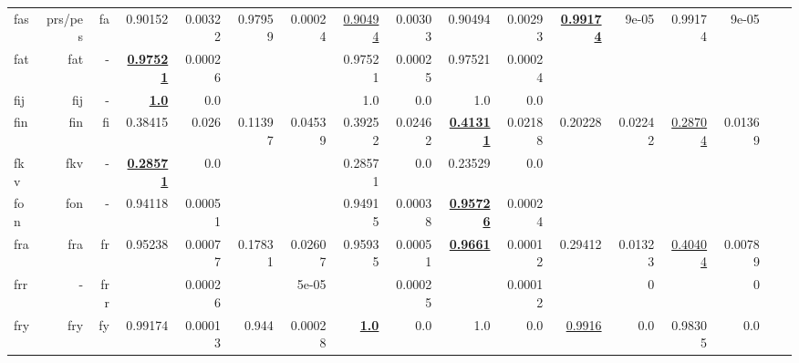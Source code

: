 \documentclass[11pt]{article}
\begin{document}
\begin{table*}[h]
{\begin{tabular}{lrrrrrrrrrrrrrrrr}
fas         & prs/pes         & fa         & 0.90152         & 0.00322         & 0.97959         & 0.00024         & \underline{0.90494}         & 0.00303         & 0.90494         & 0.00293         & \textbf{\underline{0.99174}}         & 9e-05         & 0.99174         & 9e-05         \\
fat         & fat         & -         & \textbf{\underline{0.97521}}         & 0.00026         &          &          & 0.97521         & 0.00025         & 0.97521         & 0.00024         &          &          &          &          \\
fij         & fij         & -         & \textbf{\underline{1.0}}         & 0.0         &          &          & 1.0         & 0.0         & 1.0         & 0.0         &          &          &          &          \\
fin         & fin         & fi         & 0.38415         & 0.026         & 0.11397         & 0.04539         & 0.39252         & 0.02462         & \textbf{\underline{0.41311}}         & 0.02188         & 0.20228         & 0.02242         & \underline{0.28704}         & 0.01369         \\
fkv         & fkv         & -         & \textbf{\underline{0.28571}}         & 0.0         &          &          & 0.28571         & 0.0         & 0.23529         & 0.0         &          &          &          &          \\
fon         & fon         & -         & 0.94118         & 0.00051         &          &          & 0.94915         & 0.00038         & \textbf{\underline{0.95726}}         & 0.00024         &          &          &          &          \\
fra         & fra         & fr         & 0.95238         & 0.00077         & 0.17831         & 0.02607         & 0.95935         & 0.00051         & \textbf{\underline{0.9661}}         & 0.00012         & 0.29412         & 0.01323         & \underline{0.40404}         & 0.00789         \\
frr         & -         & frr         &          & 0.00026         &          & 5e-05         &          & 0.00025         &          & 0.00012         &          & 0         &          & 0         \\
fry         & fry         & fy         & 0.99174         & 0.00013         & 0.944         & 0.00028         & \textbf{\underline{1.0}}         & 0.0         & 1.0         & 0.0         & \underline{0.9916}         & 0.0         & 0.98305         & 0.0         \\

\end{tabular}}
\end{table*}
\end{document}
